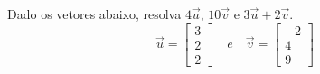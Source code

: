 \construirExeresol

\begin{exeresol}
Dado os vetores abaixo, resolva $4\vec{u}$, $10\vec{v}$ e $3\vec{u} + 2\vec{v}$.
\begin{equation}
 \vec{u} =
\left[
  \begin{array}{c}
    3 \\
    2 \\
    2
  \end{array}
\right] \quad e \quad 
 \vec{v} =
\left[
  \begin{array}{c}
    -2 \\
    4 \\
    9
  \end{array}
\right]
\end{equation}
\end{exeresol}

